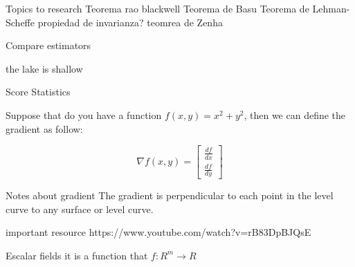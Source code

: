 \documentclass{beamer}
\begin{document}
\begin{frame}{Topics to research}
Teorema rao blackwell
Teorema de Basu
Teorema de Lehman-Scheffe
propiedad de invarianza?
teomrea de Zenha

\end{frame}


\begin{frame}{Compare estimators}


\end{frame}



\begin{frame}
 the lake is shallow 
\end{frame}



\begin{frame}{Score Statistics}


\end{frame}

\begin{frame}


Suppose that do you have a function $f(x,y) = x^{2}+y^{2}$, then we can define the gradient as follow:

\begin{equation}
\nabla f(x,y) = 
\begin{bmatrix}
\frac{df}{dx} \\
\frac{df}{dy}
\end{bmatrix}
\end{equation}





\end{frame}


\begin{frame}{Notes about gradient}
The gradient is perpendicular to each point in the level curve to any surface or level curve.

\end{frame}





\begin{frame}{important resource}
https://www.youtube.com/watch?v=rB83DpBJQsE

\end{frame}


\begin{frame}{Escalar fields}
it is a function that $f: R^{m} \rightarrow R$

\end{frame}
\end{document}
